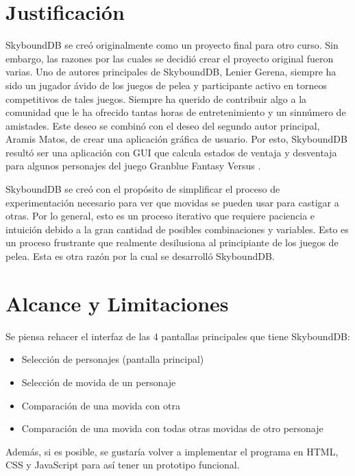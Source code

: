 \section{Justificación}
SkyboundDB se creó originalmente como un proyecto final para otro curso. Sin embargo, las razones por las cuales se decidió crear el proyecto original fueron varias. Uno de autores principales de SkyboundDB, Lenier Gerena, siempre ha sido un jugador ávido de los juegos de pelea y participante activo en torneos competitivos de tales juegos. Siempre ha querido de contribuir algo a la comunidad que le ha ofrecido tantas horas de entretenimiento y un sinnúmero de amistades. Este deseo se combinó con el deseo del segundo autor principal, Aramis Matos, de crear una aplicación gráfica de usuario. Por esto, SkyboundDB resultó ser una aplicación con GUI que calcula estados de ventaja y desventaja para algunos personajes del juego Granblue Fantasy Versus \cite{noauthor_granblue_2022-1}.

SkyboundDB
se creó con el propósito de simplificar el proceso de experimentación necesario para ver que movidas se pueden usar para castigar a otras. Por lo general, esto es un proceso iterativo que requiere paciencia e intuición debido a la gran cantidad de posibles combinaciones y variables. Esto es un proceso frustrante que realmente desilusiona al principiante de los juegos de pelea. Esta es otra razón por la cual se desarrolló SkyboundDB.

\section{Alcance y Limitaciones}

Se piensa rehacer el interfaz de las 4 pantallas principales que tiene SkyboundDB:
\begin{itemize}
    \item Selección de personajes (pantalla principal)
    \item Selección de movida de un personaje
    \item Comparación de una movida con otra
    \item Comparación de una movida con todas otras movidas de otro personaje
\end{itemize}

Además, si es posible, se gustaría volver a implementar el programa en HTML, CSS y JavaScript para así tener un prototipo funcional.

